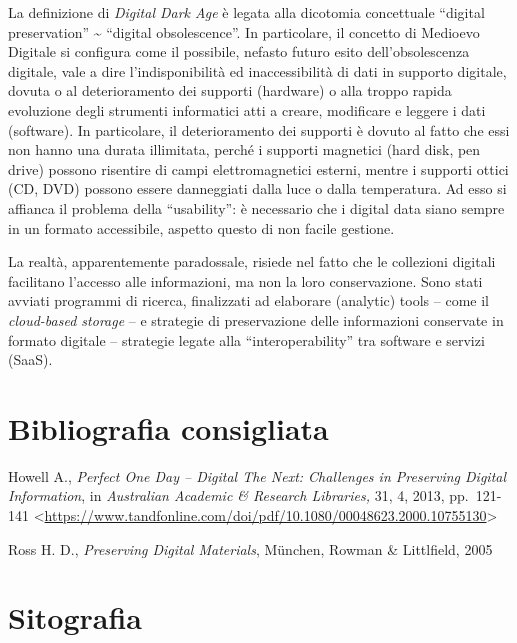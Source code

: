 \documentclass[
  b5paper,
  twoside,
  11pt,
  chapterprefix=false,
  bibliography=totocnumbered,
  parskip=0]{scrbook}
\begin{document}
La definizione di \emph{Digital Dark Age} è legata alla dicotomia concettuale
\enquote{digital preservation} \textasciitilde{} \enquote{digital obsolescence}. In particolare, il
concetto di Medioevo Digitale si configura come il possibile, nefasto
futuro esito dell'obsolescenza digitale, vale a dire l'indisponibilità
ed inaccessibilità di dati in supporto digitale, dovuta o al
deterioramento dei supporti (hardware) o alla troppo rapida evoluzione
degli strumenti informatici atti a creare, modificare e leggere i dati
(software). In particolare, il deterioramento dei supporti è dovuto al
fatto che essi non hanno una durata illimitata, perché i supporti
magnetici (hard disk, pen drive) possono risentire di campi
elettromagnetici esterni, mentre i supporti ottici (CD, DVD) possono
essere danneggiati dalla luce o dalla temperatura. Ad esso si affianca
il problema della \enquote{usability}: è necessario che i digital data siano
sempre in un formato accessibile, aspetto questo di non facile gestione.

La realtà, apparentemente paradossale, risiede nel fatto che le
collezioni digitali facilitano l'accesso alle informazioni, ma non la
loro conservazione. Sono stati avviati programmi di ricerca, finalizzati
ad elaborare (analytic) tools -- come il \emph{cloud-based storage} -- e
strategie di preservazione delle informazioni conservate in formato
digitale -- strategie legate alla \enquote{interoperability} tra software e
servizi (SaaS).

\hypertarget{bibliografia-consigliata-6}{%
\section*{Bibliografia consigliata}\label{bibliografia-consigliata-6}}

Howell A., \emph{Perfect One Day -- Digital The Next: Challenges in
Preserving Digital Information}, in \emph{Australian Academic \& Research
Libraries,} 31, 4, 2013, pp.~121-141
\textless{}\href{https://www.tandfonline.com/doi/pdf/10.1080/00048623.2000.10755130}{{https://www.tandfonline.com/doi/pdf/10.1080/00048623.2000.10755130}}\textgreater{}

Ross H. D., \emph{Preserving Digital Materials}, München, Rowman \&
Littlfield, 2005

\hypertarget{sitografia-8}{%
\section*{Sitografia}\label{sitografia-8}}
\end{document}
